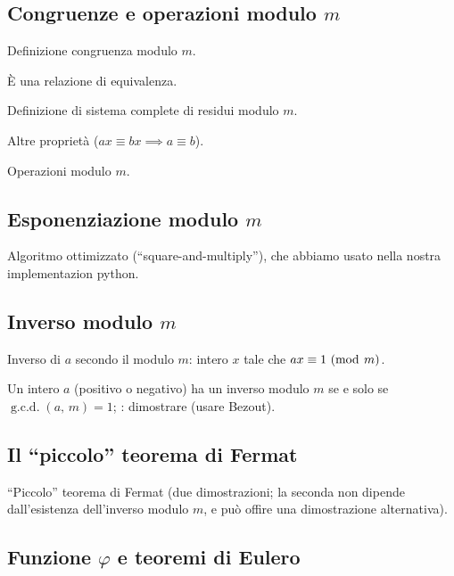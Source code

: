 \documentclass[pdflatex,11pt,a4paper,oneside]{article}
\renewcommand{\phi}{\varphi}
\newcommand{\XXX}[1][XXX]{\text{\bfseries{\color{red}{\emph{#1}}}}}
\newcommand{\TODO}[0]{\XXX[TODO]}
\newcommand{\congruent}[0]{\equiv}
\newcommand{\mmodop}[0]{\ensuremath{\operatorname{mod}}}
\newcommand{\mmod}[1]{\ensuremath{\allowbreak\ (\mmodop\:{#1})}}
\newcommand{\gcdop}[0]{\ensuremath{\operatorname{g.c.d.}}}
\newcommand{\xgcd}[1]{\ensuremath{\gcdop\left({#1}\right)}}
\renewcommand{\gcd}[2]{\xgcd{{#1},\,{#2}}}
\begin{document}
\subsection{Congruenze e operazioni modulo $m$}

Definizione congruenza modulo $m$.

\`E una relazione di equivalenza.

Definizione di sistema complete di residui modulo $m$.

Altre propriet\`a ($ax \congruent bx \implies a \congruent b$).

Operazioni modulo $m$.


\subsection{Esponenziazione modulo $m$}

Algoritmo ottimizzato (``square-and-multiply''), che abbiamo usato nella
nostra implementazion python.


\subsection{Inverso modulo $m$}

Inverso di $a$ secondo il modulo $m$: intero $x$ tale che
$ax \congruent 1 \mmod m$.

Un intero $a$ (positivo o negativo) ha un inverso modulo $m$ se e solo se
$\gcd{a}{m} = 1$; \TODO: dimostrare (usare Bezout).


\subsection{Il ``piccolo'' teorema di Fermat}

``Piccolo'' teorema di Fermat (due dimostrazioni; la seconda non dipende
dall'esistenza dell'inverso modulo $m$, e pu\`o offire una dimostrazione
alternativa).


\subsection{Funzione $\phi$ e teoremi di Eulero}
\end{document}
